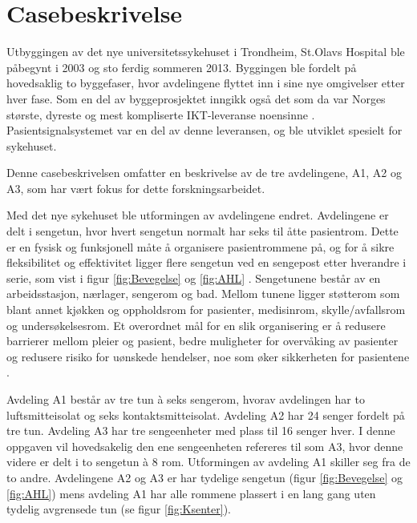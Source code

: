 \chapter{Casebeskrivelse}
\label{chp:case}
Utbyggingen av det nye universitetssykehuset i Trondheim, St.Olavs Hospital ble påbegynt i 2003 og sto ferdig sommeren 2013. Byggingen ble fordelt på hovedsaklig to byggefaser, hvor avdelingene flyttet inn i sine nye omgivelser etter hver fase. Som en del av byggeprosjektet inngikk også det som da var Norges største, dyreste og mest kompliserte IKT-leveranse noensinne \citep{TU}. Pasientsignalsystemet var en del av denne leveransen, og ble utviklet spesielt for sykehuset. 

\noindent
Denne casebeskrivelsen omfatter en beskrivelse av de tre avdelingene, A1, A2 og A3, som har vært fokus for dette forskningsarbeidet. 

\noindent
Med det nye sykehuset ble utformingen av avdelingene endret. Avdelingene er delt i sengetun, hvor hvert sengetun normalt har seks til åtte pasientrom. Dette er en fysisk og funksjonell måte å organisere pasientrommene på, og for å sikre fleksibilitet og effektivitet ligger flere sengetun ved en sengepost etter hverandre i serie, som vist i figur \ref{fig:Bevegelse} og \ref{fig:AHL} \citep{Aslaksen, sykehuskart}. Sengetunene består av en arbeidsstasjon, nærlager, sengerom og bad. Mellom tunene ligger støtterom som blant annet kjøkken og oppholdsrom for pasienter, medisinrom, skylle/avfallsrom og undersøkelsesrom. Et overordnet mål for en slik organisering er å redusere barrierer mellom pleier og pasient, bedre muligheter for overvåking av pasienter og redusere risiko for uønskede hendelser, noe som øker sikkerheten for pasientene \citep{Sintef-sengetun}.

\noindent
Avdeling A1 består av tre tun à seks sengerom, hvorav avdelingen har to luftsmitteisolat og seks kontaktsmitteisolat. Avdeling A2 har 24 senger fordelt på tre tun. Avdeling A3 har tre sengeenheter med plass til 16 senger hver. I denne oppgaven vil hovedsakelig den ene sengeenheten refereres til som A3, hvor denne videre er delt i to sengetun à 8 rom.
Utformingen av avdeling A1 skiller seg fra de to andre.
Avdelingene A2 og A3 er har tydelige sengetun (figur \ref{fig:Bevegelse} og \ref{fig:AHL}) mens avdeling A1 har alle rommene plassert i en lang gang uten tydelig avgrensede tun (se figur \ref{fig:Ksenter}).

